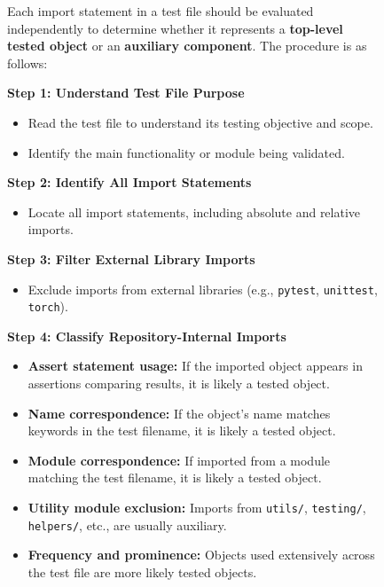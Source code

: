 \documentclass{article}
\begin{document}
\begin{figure}[t]
\centering
\begin{tcolorbox}[
    colback=white,
    colframe=black!60,
    colbacktitle=black!60,
    coltitle=white,
    title=Human Evaluation Guideline for Top-Level Tested Object Classification,
    fonttitle=\bfseries,
    boxrule=0.7pt,
    arc=1mm,
    width=0.98\linewidth
]


Each import statement in a test file should be evaluated independently to determine whether it represents a \textbf{top-level tested object} or an \textbf{auxiliary component}. The procedure is as follows:

\vspace{3pt}

\textbf{Step 1: Understand Test File Purpose}
\begin{itemize}
    \item Read the test file to understand its testing objective and scope.
    \item Identify the main functionality or module being validated.
\end{itemize}

\textbf{Step 2: Identify All Import Statements}
\begin{itemize}
    \item Locate all import statements, including absolute and relative imports.
\end{itemize}

\textbf{Step 3: Filter External Library Imports}
\begin{itemize}
    \item Exclude imports from external libraries (e.g., \texttt{pytest}, \texttt{unittest}, \texttt{torch}).
\end{itemize}

\textbf{Step 4: Classify Repository-Internal Imports}
\begin{itemize}
    \item \textbf{Assert statement usage:} If the imported object appears in assertions comparing results, it is likely a tested object.
    \item \textbf{Name correspondence:} If the object's name matches keywords in the test filename, it is likely a tested object.
    \item \textbf{Module correspondence:} If imported from a module matching the test filename, it is likely a tested object.
    \item \textbf{Utility module exclusion:} Imports from \texttt{utils/}, \texttt{testing/}, \texttt{helpers/}, etc., are usually auxiliary.
    \item \textbf{Frequency and prominence:} Objects used extensively across the test file are more likely tested objects.
\end{itemize}


\end{tcolorbox}
\end{figure}
\end{document}
